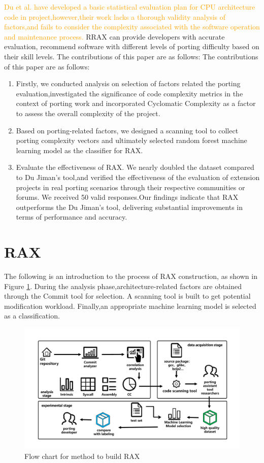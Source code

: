 \documentclass[sigconf,screen,review,anonymous]{acmart}
\begin{document}
\textcolor{orange}{Du et al. have developed a basic statistical evaluation plan for CPU architecture code in project\citep{2023du},however,their work lacks a thorough validity analysis of factors,and fails to consider the complexity associated with the software operation and maintenance process.}
RRAX can provide developers with accurate evaluation, recommend software with different levels of porting difficulty based on their skill levels. The contributions of this paper are as follows:
The contributions of this paper are as follows:
\begin{enumerate}
  \item Firstly, we conducted analysis on selection of factors related the porting evaluation,investigated the significance of code complexity metrics in the context of porting work and incorporated Cyclomatic Complexity as a factor to assess the overall complexity of  the project.
  \item Based on porting-related factors, we designed a scanning tool to collect porting complexity vectors and ultimately selected random forest machine learning model as the classifier for RAX.
  \item Evaluate the effectiveness of RAX.
 We nearly doubled the dataset compared to Du Jiman's tool,and verified the effectiveness of the evaluation of extension projects in real porting scenarios through their respective communities or forums. We received 50 valid responses.Our findings indicate that RAX outperforms the Du Jiman's tool, delivering substantial improvements in terms of performance and accuracy.
\end{enumerate}


\section{RAX}
The following is an introduction to the process of RAX construction, as shown in Figure \ref{fig:flow-chart}.
During the analysis phase,architecture-related factors are obtained through the Commit tool for selection.
A scanning tool is built to get potential modification workload.
Finally,an appropriate machine learning model is selected as a classification.

\begin{figure}
  \centering
  \includegraphics[width=\linewidth]{flow-chart.pdf}
  \caption{Flow chart for method to build RAX}
  \label{fig:flow-chart}
\end{figure}
\end{document}
